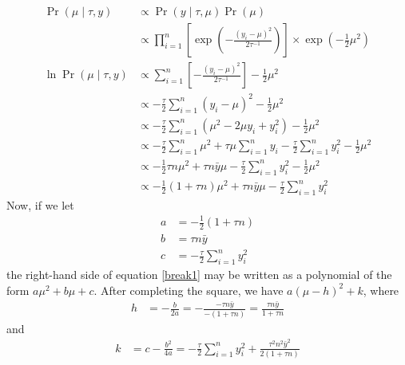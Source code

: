 \documentclass[letterpaper]{amsart}
\begin{document}
\section{}
\begin{align}
\Pr(\mu\mid\tau, y)
    &\propto
    \Pr(y\mid\tau, \mu)
    \Pr(\mu)
    \\
    &\propto
    \prod_{i=1}^n
    \left[
    \exp\left(-\frac{\left(y_i-\mu\right)^2}{2\tau^{-1}}\right)
    \right]
    \times
    \exp\left(-\frac{1}{2}\mu^2\right)
    \\
    \ln
    \Pr(\mu\mid\tau, y)
    &\propto
    \sum_{i=1}^n
    \left[
    -\frac{\left(y_i-\mu\right)^2}{2\tau^{-1}}
    \right]
    -\frac{1}{2}\mu^2
    \\
    &\propto
    -\frac{\tau}{2}
    \sum_{i=1}^n
    \left(y_i-\mu\right)^2
    -\frac{1}{2}\mu^2
    \\
    &\propto
    -\frac{\tau}{2}
    \sum_{i=1}^n
    \left(\mu^2-2\mu y_i + y_i^2\right)
    -\frac{1}{2}\mu^2
    \\
    &\propto
    -\frac{\tau}{2}
    \sum_{i=1}^n \mu^2
    +\tau\mu\sum_{i=1}^n y_i
    -\frac{\tau}{2}
    \sum_{i=1}^n y_i^2
    -\frac{1}{2}\mu^2
    \\
    &\propto
    -\frac{1}{2}
    \tau n \mu^2
    +\tau n\bar{y}\mu
    -\frac{\tau}{2}
    \sum_{i=1}^n y_i^2
    -\frac{1}{2}\mu^2
    \\
    &\propto
    -\frac{1}{2}
    \left(1+\tau n\right) \mu^2
    +\tau n\bar{y}\mu
    -\frac{\tau}{2}
    \sum_{i=1}^n y_i^2
\end{align}
Now, if we let 
\begin{align}
    a &= 
    -\frac{1}{2}
    \left(1+\tau n\right)
    \\
    b &= 
    \tau n\bar{y}
    \\
    c &= 
    -\frac{\tau}{2}
    \sum_{i=1}^n y_i^2
\end{align}
the right-hand side of equation \ref{break1} may be written as a polynomial of the form
$a\mu^2 + b\mu + c$.
After completing the square, we have
$a\left(\mu - h\right)^2+k$,
where
\begin{align}
    h &= -\frac{b}{2a}
    = -\frac{-\tau n\bar{y}}{-\left(1+\tau n\right)}
    = \frac{\tau n\bar{y}}{1+\tau n}
\end{align}
and
\begin{align}
    k &= c-\frac{b^2}{4a}
    = -\frac{\tau}{2}
    \sum_{i=1}^n y_i^2
    +\frac{\tau^2 n^2\bar{y}^2}{2\left(1+\tau n\right)}
\end{align}
\end{document}
